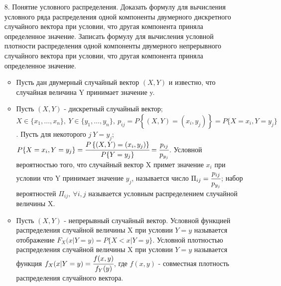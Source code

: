 \documentclass[a4paper]{article}
\begin{document}
\begin{enumerate}
\item[8.] Понятие условного распределения. Доказать формулу для вычисления условного ряда распределения одной компоненты двумерного дискретного случайного вектора при условии, что другая компонента приняла определенное значение. Записать формулу для вычисления условной плотности распределения одной компоненты двумерного непрерывного случайного вектора при условии, что другая компонента приняла определенное значение. \\
\begin{itemize}
\item Пусть дан двумерный случайный вектор $(X,Y)$ и известно, что случайная величина Y принимает значение y.
\item Пусть $(X,Y)$ - дискретный случайный вектор; $X \in \{x_1, \ldots, x_n\}, \ Y \in \{y_1, \ldots, y_n\}, \ p_{ij} = P\left\{ (X,Y) = (x_i,y_j) \right\} = P\{X = x_i, Y = y_j\}$. Пусть для некоторого $j \ Y = y_j$; $P\{X = x_i, Y = y_j\} = \cfrac{P\left\{(X,Y) = (x_i,y_j) \right\}}{P\{Y = y_j\}} = \cfrac{p_{ij}}{p_{y_j}}$. Условной вероятностью того, что случайный вектор X примет значение $x_i$ при условии что Y принимает значение $y_j$, называется число $\Pi_{ij} = \cfrac{p_{ij}}{p_{y_j}}$; набор вероятностей $\Pi_{ij}, \ \forall i,j$ называется условным распределением случайной величины X.
\item Пусть $(X,Y)$ - непрерывный случайный вектор. Условной функцией распределения случайной величины X при условии $Y = y$ называется отображение $F_X(x|Y = y) = P\{X < x|Y = y\}$. Условной плотностью распределения случайной величины X при условии $Y = y$ называется функция $f_X(x|Y = y) = \cfrac{f(x,y)}{f_Y(y)}$, где $f(x,y)$ - совместная плотность распределения случайного вектора.
\end{itemize}



\end{enumerate}
\end{document}
